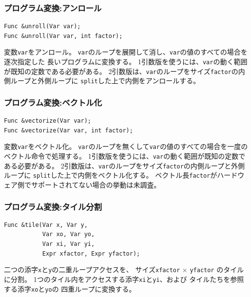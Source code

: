 \documentclass[dvipdfmx,cjk]{beamer}
\begin{document}
\begin{frame}[fragile]\frametitle{プログラム変換:アンロール}
\begin{verbatim}
Func &unroll(Var var);
Func &unroll(Var var, int factor);
\end{verbatim}

変数{\tt var}をアンロール。
{\tt var}のループを展開して消し、{\tt var}の値のすべての場合を逐次指定した
長いプログラムに変換する。
1引数版を使うには、{\tt var}の動く範囲が既知の定数である必要がある。
2引数版は、{\tt var}のループをサイズ{\tt factor}の内側ループと外側ループに
{\tt split}した上で内側をアンロールする。

\end{frame}

\begin{frame}[fragile]\frametitle{プログラム変換:ベクトル化}
\begin{verbatim}
Func &vectorize(Var var);
Func &vectorize(Var var, int factor);
\end{verbatim}

変数{\tt var}をベクトル化。
{\tt var}のループを無くして{\tt var}の値のすべての場合を一度の
ベクトル命令で処理する。
1引数版を使うには、{\tt var}の動く範囲が既知の定数である必要がある。
2引数版は、{\tt var}のループをサイズ{\tt factor}の内側ループと外側ループに
{\tt split}した上で内側をベクトル化する。
ベクトル長{\tt factor}がハードウェア側でサポートされてない場合の挙動は未調査。


\end{frame}

\begin{frame}[fragile]\frametitle{プログラム変換:タイル分割}

\begin{verbatim}
Func &tile(Var x, Var y,
           Var xo, Var yo,
           Var xi, Var yi,
           Expr xfactor, Expr yfactor);
\end{verbatim}

二つの添字{\tt x}と{\tt y}の二重ループアクセスを、
サイズ{\tt xfactor} $\times$
{\tt yfactor} のタイルに分割。
1つのタイル内をアクセスする添字{\tt xi}と{\tt yi}、および
タイルたちを参照する添字{\tt xo}と{\tt yo}の
四重ループに変換する。
\end{frame}
\end{document}
